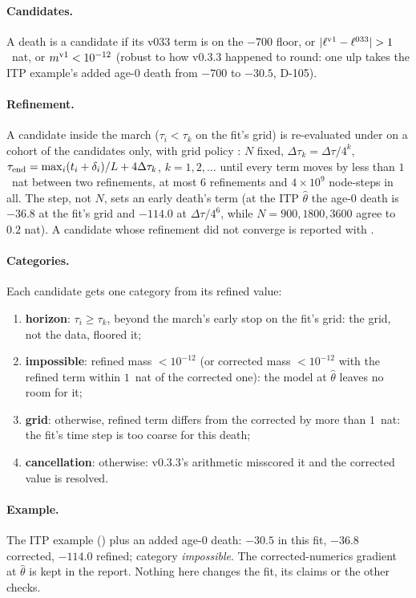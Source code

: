 \paragraph{Candidates.} A death is a candidate if its v033 term is on the $-700$ floor, or $|\ell^{\rm v1}-\ell^{033}|>1$~nat,
or $m^{\rm v1}<10^{-12}$ (robust to how v0.3.3 happened to round: one ulp takes the ITP example's added age-0 death from $-700$ to $-30.5$,
D-105).
\paragraph{Refinement.} A candidate inside the march ($\tau_i<\tau_k$ on the fit's grid) is re-evaluated under  on a cohort of the
candidates only, with grid policy : $N$ fixed, $\Delta\tau_k=\Delta\tau/4^k$, $\tau_{\rm end}=\max_i(t_i+\delta_i)/L+4\Delta\tau_k$,
$k=1,2,\dots$ until every term moves by less than $1$~nat between two refinements, at most $6$ refinements and
$4\times10^9$ node-steps in all. The step, not $N$, sets an early death's term (at the ITP $\hat\theta$ the age-0 death is
$-36.8$ at the fit's grid and $-114.0$ at $\Delta\tau/4^6$, while $N=900,1800,3600$ agree to $0.2$ nat). A candidate whose refinement did not converge
is reported with .
\paragraph{Categories.} Each candidate gets one category from its refined value:
\begin{enumerate}[nosep]
  \item \textbf{horizon}: $\tau_i\ge\tau_k$, beyond the march's early stop on the fit's grid: the grid, not the data, floored it;
  \item \textbf{impossible}: refined mass $<10^{-12}$ (or corrected mass $<10^{-12}$ with the refined term within $1$~nat of the corrected one): the model at $\hat\theta$ leaves no room for it;
  \item \textbf{grid}: otherwise, refined term differs from the corrected by more than $1$~nat: the fit's time step is too coarse for this death;
  \item \textbf{cancellation}: otherwise: v0.3.3's arithmetic misscored it and the corrected value is resolved.
\end{enumerate}
\paragraph{Example.} The ITP example () plus an added age-0 death:
$-30.5$ in this fit, $-36.8$ corrected, $-114.0$ refined; category \emph{impossible}. The corrected-numerics
gradient at $\hat\theta$ is kept in the report. Nothing here changes the fit, its claims or the other checks.

